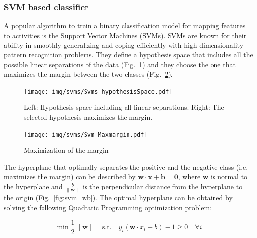 

\subsubsection*{SVM based classifier}

A popular algorithm to train a binary classification model for mapping
features to activities is the Support Vector Machines (SVMs). SVMs are
known for their ability in smoothly generalizing and coping
efficiently with high-dimensionality pattern recognition
problems. They define a hypothesis space that includes all the
possible linear separations of the data
(Fig.~\ref{fig:svm_hypothesisSpace}) and they choose the one that
maximizes the margin between the two classes
(Fig.~\ref{fig:svm_margin}).

\begin{figure}[h]
\centering
  \texttt{[image: img/svms/Svms\_hypothesisSpace.pdf]}
  \caption{Left: Hypothesis space including all linear separations. Right: The selected hypothesis maximizes the margin.}
  \label{fig:svm_hypothesisSpace}
\end{figure}


\begin{figure}[h]
\centering
  \texttt{[image: img/svms/Svm\_Maxmargin.pdf]}
  \caption{Maximization of the margin}
  \label{fig:svm_margin}
\end{figure}

\noindent The hyperplane that optimally separates the positive and the
negative class (i.e. maximizes the margin) can be described by
$\mathbf{w\cdot x + b = 0}$, where $\mathbf{w}$ is normal to the
hyperplane and $\frac{b}{\parallel\mathbf{w}\parallel}$ is the
perpendicular distance from the hyperplane to the origin
(Fig.~\ref{fig:svm_wb}). The optimal hyperplane can be obtained by
solving the following Quadratic Programming optimization problem:

\begin{equation}\label{Eq:svmQP0}
  \min \frac{1}{2}\parallel\mathbf{w}\parallel \quad \text{s.t.} \quad y_i(\mathbf{w}\cdot x_i + b) -1 \ge 0 \quad \forall i
\end{equation}

